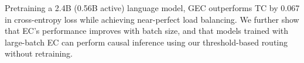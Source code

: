 \documentclass{article}
\theoremstyle{plain}
\theoremstyle{definition}
\theoremstyle{remark}
\begin{document}



Pretraining a 2.4B (0.56B active) language model, GEC outperforms TC by 0.067 in cross-entropy loss while achieving near-perfect load balancing.
We further show that EC's performance improves with batch size, and that models trained with large-batch EC can perform causal inference using our threshold-based routing without retraining.
\end{document}
